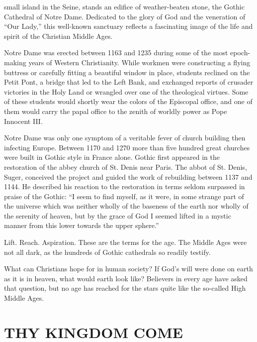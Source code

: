 
 small island in the Seine, stands an edifice of weather-beaten stone, the
Gothic Cathedral of Notre Dame. Dedicated to the glory of God and the veneration of “Our Lady,” this
well-known sanctuary reflects a fascinating image of the life and spirit of the Christian Middle
Ages.

Notre Dame was erected between 1163 and 1235 during some of the most epoch-making years of Western
Christianity. While workmen were constructing a flying buttress or carefully fitting a beautiful
window in place, students reclined on the Petit Pont, a bridge that led to the Left Bank, and
exchanged reports of crusader victories in the Holy Land or wrangled over one of the theological
virtues. Some of these students would shortly wear the colors of the Episcopal office, and one of
them would carry the papal office to the zenith of worldly power as Pope Innocent III.

Notre Dame was only one symptom of a veritable fever of church building then infecting Europe.
Between 1170 and 1270 more than five hundred great churches were built in Gothic style in France
alone. Gothic first appeared in the restoration of the abbey church of St. Denis near Paris. The
abbot of St. Denis, Suger, conceived the project and guided the work of rebuilding between 1137 and
1144. He described his reaction to the restoration in terms seldom surpassed in praise of the
Gothic: “I seem to find myself, as it were, in some strange part of the universe which was neither
wholly of the baseness of the earth nor wholly of the serenity of heaven, but by the grace of God I
seemed lifted in a mystic manner from this lower towards the upper sphere.”

Lift. Reach. Aspiration. These are the terms for the age. The Middle Ages were not all dark, as the
hundreds of Gothic cathedrals so readily testify.

What can Christians hope for in human society? If God’s will were done on earth as it is in heaven,
what would earth look like? Believers in every age have asked that question, but no age has reached
for the stars quite like the so-called High Middle Ages.

\section{THY KINGDOM COME}

